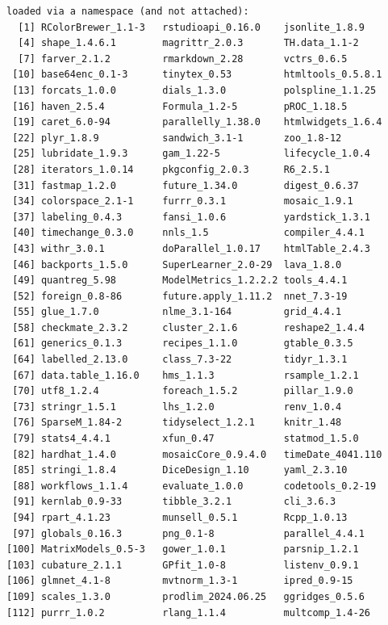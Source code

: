 \documentclass[
  11pt,
  a4paper,
]{article}
\theoremstyle{plain}
\theoremstyle{plain}
\theoremstyle{plain}
\theoremstyle{definition}
\theoremstyle{remark}
\begin{document}
\begin{verbatim}
loaded via a namespace (and not attached):
  [1] RColorBrewer_1.1-3   rstudioapi_0.16.0    jsonlite_1.8.9      
  [4] shape_1.4.6.1        magrittr_2.0.3       TH.data_1.1-2       
  [7] farver_2.1.2         rmarkdown_2.28       vctrs_0.6.5         
 [10] base64enc_0.1-3      tinytex_0.53         htmltools_0.5.8.1   
 [13] forcats_1.0.0        dials_1.3.0          polspline_1.1.25    
 [16] haven_2.5.4          Formula_1.2-5        pROC_1.18.5         
 [19] caret_6.0-94         parallelly_1.38.0    htmlwidgets_1.6.4   
 [22] plyr_1.8.9           sandwich_3.1-1       zoo_1.8-12          
 [25] lubridate_1.9.3      gam_1.22-5           lifecycle_1.0.4     
 [28] iterators_1.0.14     pkgconfig_2.0.3      R6_2.5.1            
 [31] fastmap_1.2.0        future_1.34.0        digest_0.6.37       
 [34] colorspace_2.1-1     furrr_0.3.1          mosaic_1.9.1        
 [37] labeling_0.4.3       fansi_1.0.6          yardstick_1.3.1     
 [40] timechange_0.3.0     nnls_1.5             compiler_4.4.1      
 [43] withr_3.0.1          doParallel_1.0.17    htmlTable_2.4.3     
 [46] backports_1.5.0      SuperLearner_2.0-29  lava_1.8.0          
 [49] quantreg_5.98        ModelMetrics_1.2.2.2 tools_4.4.1         
 [52] foreign_0.8-86       future.apply_1.11.2  nnet_7.3-19         
 [55] glue_1.7.0           nlme_3.1-164         grid_4.4.1          
 [58] checkmate_2.3.2      cluster_2.1.6        reshape2_1.4.4      
 [61] generics_0.1.3       recipes_1.1.0        gtable_0.3.5        
 [64] labelled_2.13.0      class_7.3-22         tidyr_1.3.1         
 [67] data.table_1.16.0    hms_1.1.3            rsample_1.2.1       
 [70] utf8_1.2.4           foreach_1.5.2        pillar_1.9.0        
 [73] stringr_1.5.1        lhs_1.2.0            renv_1.0.4          
 [76] SparseM_1.84-2       tidyselect_1.2.1     knitr_1.48          
 [79] stats4_4.4.1         xfun_0.47            statmod_1.5.0       
 [82] hardhat_1.4.0        mosaicCore_0.9.4.0   timeDate_4041.110   
 [85] stringi_1.8.4        DiceDesign_1.10      yaml_2.3.10         
 [88] workflows_1.1.4      evaluate_1.0.0       codetools_0.2-19    
 [91] kernlab_0.9-33       tibble_3.2.1         cli_3.6.3           
 [94] rpart_4.1.23         munsell_0.5.1        Rcpp_1.0.13         
 [97] globals_0.16.3       png_0.1-8            parallel_4.4.1      
[100] MatrixModels_0.5-3   gower_1.0.1          parsnip_1.2.1       
[103] cubature_2.1.1       GPfit_1.0-8          listenv_0.9.1       
[106] glmnet_4.1-8         mvtnorm_1.3-1        ipred_0.9-15        
[109] scales_1.3.0         prodlim_2024.06.25   ggridges_0.5.6      
[112] purrr_1.0.2          rlang_1.1.4          multcomp_1.4-26     
\end{verbatim}
\end{document}
